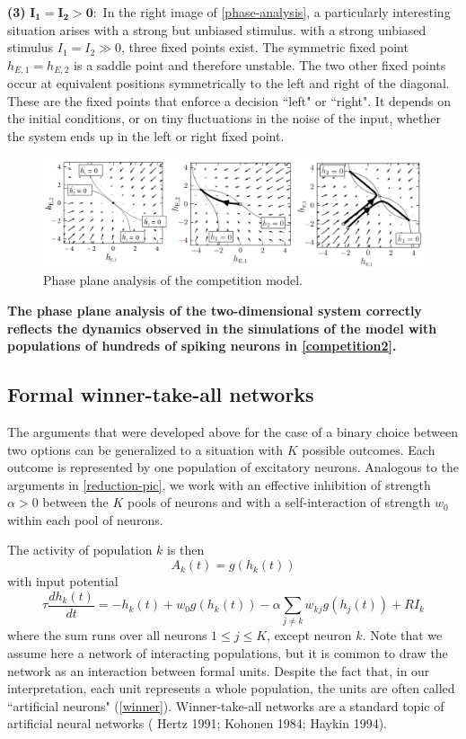 \documentclass[12pt,hyperref,a4paper,UTF8]{ctexart}
\begin{document}
\textbf{(3)} $\mathbf{I_1=I_2>0}:$ In the right image of \autoref{phase-analysis}, a particularly interesting situation arises with a strong but unbiased stimulus. with a strong unbiased stimulus $I_1 = I_2 \gg 0$, three fixed points exist. The symmetric fixed point $h_{E,1} = h_{E,2}$ is a saddle point and therefore unstable. The two other fixed points occur at equivalent positions symmetrically to the left and right of the diagonal. These are the fixed points that enforce a decision ``left" or ``right". It depends on the initial conditions, or on tiny fluctuations in the noise of the input, whether the system ends up in the left or right fixed point. 

\begin{figure}[h]
    \begin{center}
    \includegraphics[width=\textwidth]{phase-analysis.png}
    \caption{Phase plane analysis of the competition model.}
    \label{phase-analysis}
    \end{center}
\end{figure}

\textbf{The phase plane analysis of the two-dimensional system correctly reflects the dynamics observed in the simulations of the model with populations of hundreds of spiking neurons in \autoref{competition2}.}

\subsection{Formal winner-take-all networks}

The arguments that were developed above for the case of a binary choice between two options can be generalized to a situation with $K$ possible outcomes. Each outcome is represented by one population of excitatory neurons. Analogous to the arguments in \autoref{reduction-pic}, we work with an effective inhibition of strength $\alpha > 0$ between the $K$ pools of neurons and with a self-interaction of strength $w_0$ within each pool of neurons.

The activity of population $k$ is then
$$A_k(t)=g(h_k(t))$$
with input potential
$$\tau \frac{dh_k(t)}{dt}=-h_k(t)+w_0g(h_k(t))-\alpha\sum_{j\neq k}w_{kj}g(h_j(t))+RI_k$$
where the sum runs over all neurons $1 \leq j \leq K$, except neuron $k$. Note that we assume here a network of interacting populations, but it is common to draw the network as an interaction between formal units. Despite the fact that, in our interpretation, each unit represents a whole population, the units are often called ``artificial neurons" (\autoref{winner}). Winner-take-all networks are a standard topic of artificial neural networks (\cite{Hertz 1991} Hertz 1991; \cite{Kohonen 1984} Kohonen 1984; \cite{Haykin 1994} Haykin 1994). 
\end{document}
